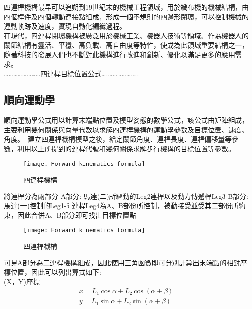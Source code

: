 四連桿機構最早可以追朔到19世紀末的機械工程領域，用於織布機的機械結構，由四個桿件及四個轉動連接點組成，形成一個不規則的四邊形閉環，可以控制機械的運動軌跡及速度，實現自動化編織過程。\\
在現代，四連桿閉環機構被廣泛用於機械工業、機器人技術等領域。作為機器人的關節結構有靈活、平穩、高負載、高自由度等特性，使成為此領域重要結構之一，隨著科技的發展人們也不斷對此機構進行改進和創新、優化以滿足更多的應用需求。\\

……………………四連桿目標位置公式….………………..

\subsection{順向運動學}
順向運動學公式用以計算末端點位置及模型姿態的數學公式，該公式由矩陣組成，主要利用幾何關係與向量代數以求解四連桿機構的運動學參數及目標位置、速度、角度。\
建立四連桿機構模型之後，給定關節角度、連桿長度、連桿偏移量等參數，利用以上所提到的連桿代號和幾何關係求解步行機構的目標位置等參數。\\

\begin{figure}[hbt!]
\begin{center}
\texttt{[image: Forward kinematics formula]}
\caption{\Large 四連桿機構}\label{Forward kinematics formula}
\end{center}
\end{figure}

將連桿分為兩部分
A部分: 馬達(二)所驅動的Leg2連桿以及動力傳遞桿Leg3
B部分:馬達(一)控制的Leg1-5
連桿Leg4為A、B部份所控制，被動接受並受其二部份所約束，因此合併A、B部分即可找出目標位置點

\begin{figure}[hbt!]
\begin{center}
\texttt{[image: Forward kinematics formula]}
\caption{\Large 四連桿機構}\label{Forward kinematics formula}
\end{center}
\end{figure}

可見A部分為二連桿機構組成，因此使用三角函數即可分別計算出末端點的相對座標位置，因此可以列出算式如下:\\

(X，Y)座標    
\[
\begin{aligned}
x=L_{1}\cos \alpha +L_{2}\cos \left( \alpha +\beta \right)\\
y=L_{1}\sin \alpha +L_{2}\sin \left( \alpha +\beta \right) 
\end{aligned}
\]

